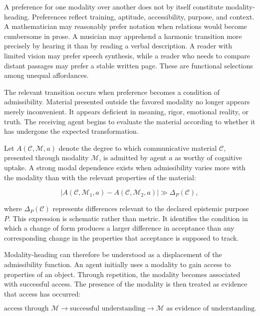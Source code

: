\documentclass[11pt]{article}
\newcommand{\modality}{\mathcal{M}}
\newcommand{\contentobj}{\mathcal{C}}
\begin{document}
A preference for one modality over another does not by itself constitute
modality-heading. Preferences reflect training, aptitude, accessibility,
purpose, and context. A mathematician may reasonably prefer notation when
relations would become cumbersome in prose. A musician may apprehend a
harmonic transition more precisely by hearing it than by reading a verbal
description. A reader with limited vision may prefer speech synthesis, while
a reader who needs to compare distant passages may prefer a stable written
page. These are functional selections among unequal affordances.

The relevant transition occurs when preference becomes a condition of
admissibility. Material presented outside the favored modality no longer
appears merely inconvenient. It appears deficient in meaning, rigor,
emotional reality, or truth. The receiving agent begins to evaluate the
material according to whether it has undergone the expected transformation.

Let \(A(\contentobj,\modality,a)\) denote the degree to which communicative
material \(\contentobj\), presented through modality \(\modality\), is admitted
by agent \(a\) as worthy of cognitive uptake. A strong modal dependence exists
when admissibility varies more with the modality than with the relevant
properties of the material:

\begin{equation}
  \left|
  A(\contentobj,\modality_1,a)
  -
  A(\contentobj,\modality_2,a)
  \right|
  \gg
  \Delta_P(\contentobj),
  \label{eq:modal-dependence}
\end{equation}

where \(\Delta_P(\contentobj)\) represents differences relevant to the
declared epistemic purpose \(P\). This expression is schematic rather than
metric. It identifies the condition in which a change of form produces a
larger difference in acceptance than any corresponding change in the
properties that acceptance is supposed to track.

Modality-heading can therefore be understood as a displacement of the
admissibility function. An agent initially uses a modality to gain access to
properties of an object. Through repetition, the modality becomes associated
with successful access. The presence of the modality is then treated as
evidence that access has occurred:

\begin{equation}
  \text{access through }\modality
  \longrightarrow
  \text{successful understanding}
  \longrightarrow
  \modality\text{ as evidence of understanding}.
  \label{eq:admissibility-displacement}
\end{equation}
\end{document}
